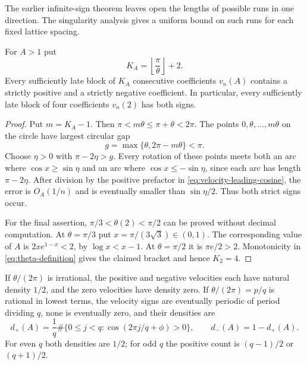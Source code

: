 The earlier infinite-sign theorem leaves open the lengths of possible
runs in one direction.  The singularity analysis gives a uniform bound
on such runs for each fixed lattice spacing.

\begin{corollary}
\label{cor:bounded-sign-gaps}
For $A>1$ put
\[
 K_A=\left\lfloor\frac\pi\theta\right\rfloor+2.
\]
Every sufficiently late block of $K_A$ consecutive coefficients $v_n(A)$
contains a strictly positive and a strictly negative coefficient.  In
particular, every sufficiently late block of four coefficients $v_n(2)$
has both signs.
\end{corollary}

\begin{proof}
Put $m=K_A-1$.  Then $\pi<m\theta\leq\pi+\theta<2\pi$.
The points $0,\theta,\ldots,m\theta$ on the circle have largest
circular gap
\[
 g=\max\{\theta,2\pi-m\theta\}<\pi.
\]
Choose $\eta>0$ with $\pi-2\eta>g$.  Every rotation of these points
meets both an arc where $\cos x\geq\sin\eta$ and an arc where
$\cos x\leq-\sin\eta$, since each arc has length $\pi-2\eta$.
After division by the positive prefactor in
\eqref{eq:velocity-leading-cosine}, the error is $O_A(1/n)$ and is
eventually smaller than $\sin\eta/2$.  Thus both strict signs occur.

For the final assertion, $\pi/3<\theta(2)<\pi/2$ can be proved without
decimal computation.  At $\theta=\pi/3$ put
$x=\pi/(3\sqrt3)\in(0,1)$.  The corresponding value of $A$ is
$2xe^{1-x}<2$, by $\log x<x-1$.  At $\theta=\pi/2$ it is
$\pi e/2>2$.  Monotonicity in \eqref{eq:theta-definition} gives the
claimed bracket and hence $K_2=4$.
\end{proof}

\begin{theorem}
\label{thm:sign-density}
If $\theta/(2\pi)$ is irrational, the positive and negative velocities
each have natural density $1/2$, and the zero velocities have density
zero.  If $\theta/(2\pi)=p/q$ is rational in lowest terms, the velocity
signs are eventually periodic of period dividing $q$, none is eventually
zero, and their densities are
\begin{equation}\label{eq:rational-sign-density}
 d_+(A)=\frac1q\#\{0\leq j<q:
                     \cos(2\pi j/q+\phi)>0\},\qquad
 d_-(A)=1-d_+(A).
\end{equation}
For even $q$ both densities are $1/2$; for odd $q$ the positive count is
$(q-1)/2$ or $(q+1)/2$.
\end{theorem}

